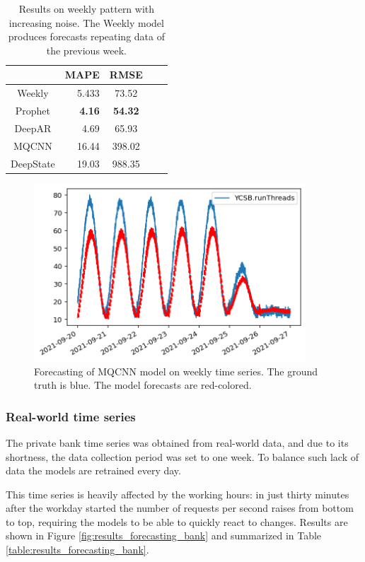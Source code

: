 \documentclass[a4paper, 12pt]{article} %
\newcommand{\ra}[1]{\renewcommand{\arraystretch}{#1}}
\begin{document}
	\begin{table}\centering 
		\ra{1.3}
		\begin{tabular}{@{}crcrc@{}}
			\midrule
			& MAPE & RMSE\\
			\midrule
			Weekly & 5.433 & 73.52\\
			Prophet & \textbf{4.16} & \textbf{54.32}\\
			DeepAR & 4.69 & 65.93\\
			MQCNN & 16.44 & 398.02\\
			DeepState & 19.03 & 988.35\\
			\bottomrule
		\end{tabular}
		\caption{Results on weekly pattern with increasing noise. The Weekly model produces forecasts repeating data of the previous week.} \label{table:results_forecasting_weekly}
	\end{table}
	
	\begin{figure} \centering
		\includegraphics[width=4in]{img/results_forecasting_weekly_mqcnn.png}
		\caption{Forecasting of MQCNN model on weekly time series. The ground truth is blue. The model forecasts are red-colored. }
		\label{fig:results_forecasting_weekly_mqcnn}
	\end{figure}
	
	\clearpage
	\subsubsection{Real-world time series} \label{sssec:results_forecasting_bank}
	The private bank time series was obtained from real-world data, and due to its shortness, the data collection period was set to one week. To balance such lack of data the models are retrained every day. 
	
	This time series is heavily affected by the working hours: in just thirty minutes after the workday started the number of requests per second raises from bottom to top, requiring the models to be able to quickly react to changes. Results are shown in Figure \ref{fig:results_forecasting_bank} and summarized in Table \ref{table:results_forecasting_bank}. 
	
\end{document}
